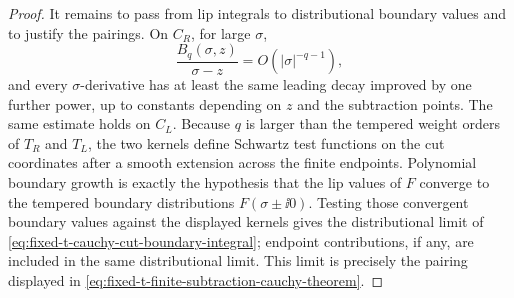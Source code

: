 \begin{proof}
It remains to pass from lip integrals to distributional boundary values and
to justify the pairings.  On \(C_R\), for large \(\sigma\),
\[
  \frac{B_q(\sigma,z)}{\sigma-z}=O(|\sigma|^{-q-1}),
\]
and every \(\sigma\)-derivative has at least the same leading decay improved
by one further power, up to constants depending on \(z\) and the subtraction
points.  The same estimate holds on \(C_L\).  Because \(q\) is larger than the
tempered weight orders of \(T_R\) and \(T_L\), the two kernels define
Schwartz test functions on the cut coordinates after a smooth extension
across the finite endpoints.  Polynomial boundary growth is exactly the
hypothesis that the lip values of \(F\) converge to the tempered boundary
distributions \(F(\sigma\pm\ii0)\).  Testing those convergent boundary values
against the displayed kernels gives the distributional limit of
\eqref{eq:fixed-t-cauchy-cut-boundary-integral}; endpoint contributions, if
any, are included in the same distributional limit.  This limit is precisely
the pairing displayed in
\eqref{eq:fixed-t-finite-subtraction-cauchy-theorem}.
\end{proof}

